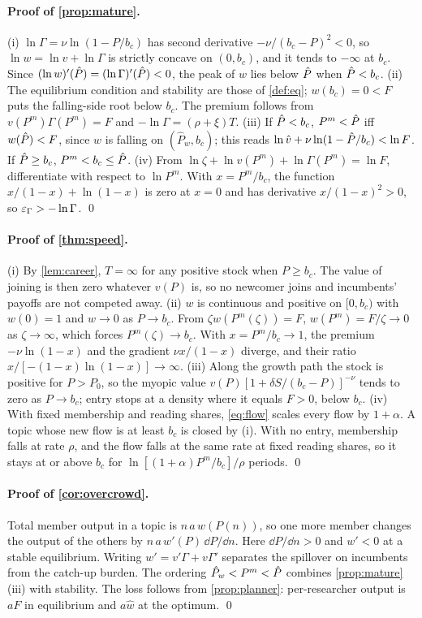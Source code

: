 \paragraph{Proof of \cref{prop:mature}.} (i) $\ln\Gamma=\nu\ln(1-P/b_c)$ has
second derivative $-\nu/(b_c-P)^2<0$, so $\ln w=\ln v+\ln\Gamma$ is strictly
concave on $(0,b_c)$, and it tends to $-\infty$ at $b_c$. Since
$(\ln w)'(\hat P)=(\ln\Gamma)'(\hat P)<0$, the peak of $w$ lies below $\hat P$
when $\hat P<b_c$. (ii) The equilibrium condition and stability are those of
\cref{def:eq}; $w(b_c)=0<F$ puts the falling-side root below $b_c$. The premium
follows from $v(P^m)\Gamma(P^m)=F$ and $-\ln\Gamma=(\rho+\xi)T$. (iii) If
$\hat P<b_c$, $P^m<\hat P$ iff $w(\hat P)<F$, since $w$ is falling on
$(\hat P_w,b_c)$; this reads $\ln\hat v+\nu\ln(1-\hat P/b_c)<\ln F$. If $\hat P\ge
b_c$, $P^m<b_c\le\hat P$. (iv) From $\ln\zeta+\ln v(P^m)+\ln\Gamma(P^m)=\ln F$,
differentiate with respect to $\ln P^m$. With $x=P^m/b_c$, the function
$x/(1-x)+\ln(1-x)$ is zero at $x=0$ and has derivative $x/(1-x)^2>0$, so
$\varepsilon_\Gamma>-\ln\Gamma$. \qed

\paragraph{Proof of \cref{thm:speed}.} (i) By \cref{lem:career}, $T=\infty$ for
any positive stock when $P\ge b_c$. The value of joining is then zero whatever
$v(P)$ is, so no newcomer joins and incumbents' payoffs are not competed away.
(ii) $w$ is continuous and positive on $[0,b_c)$ with $w(0)=1$ and $w\to0$ as
$P\to b_c$. From $\zeta w(P^m(\zeta))=F$, $w(P^m)=F/\zeta\to0$ as
$\zeta\to\infty$, which forces $P^m(\zeta)\to b_c$. With $x=P^m/b_c\to1$, the
premium $-\nu\ln(1-x)$ and the gradient $\nu x/(1-x)$ diverge, and their ratio
$x/[-(1-x)\ln(1-x)]\to\infty$. (iii) Along the growth path the stock is
positive for $P>P_0$, so the myopic value
$v(P)[1+\delta S/(b_c-P)]^{-\nu}$ tends to zero as $P\to b_c$; entry stops at
a density where it equals $F>0$, below $b_c$. (iv) With fixed membership and
reading shares, \eqref{eq:flow} scales every flow by $1+\alpha$. A topic whose
new flow is at least $b_c$ is closed by (i). With no entry, membership falls
at rate $\rho$, and the flow falls at the same rate at fixed reading shares, so
it stays at or above $b_c$ for $\ln[(1+\alpha)P^m/b_c]/\rho$ periods. \qed

\paragraph{Proof of \cref{cor:overcrowd}.} Total member output in a topic is
$n\,a\,w(P(n))$, so one more member changes the output of the others by
$n\,a\,w'(P)\,\dd P/\dd n$. Here $\dd P/\dd n>0$ and $w'<0$ at a stable
equilibrium. Writing $w'=v'\Gamma+v\Gamma'$ separates the spillover on
incumbents from the catch-up burden. The ordering $\hat P_w<P^m<\hat P$ combines
\cref{prop:mature}(iii) with stability. The loss follows from
\cref{prop:planner}: per-researcher output is $aF$ in equilibrium and $a\hat w$
at the optimum. \qed


